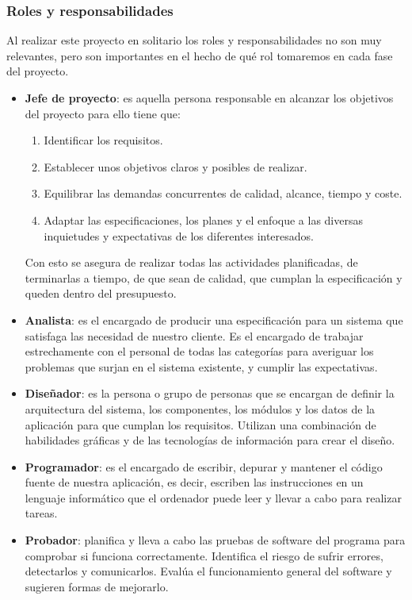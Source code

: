 \documentclass[a4paper,11pt, twoside]{article}
\begin{document}
\subsubsection{Roles y responsabilidades}
Al realizar este proyecto en solitario los roles y responsabilidades no son muy relevantes, pero son importantes en el hecho de qué rol tomaremos en cada fase del proyecto.
\begin{itemize}[noitemsep,topsep=0pt]
\item \textbf{Jefe de proyecto}: es aquella persona responsable en alcanzar los objetivos del proyecto para ello tiene que: 
\begin{enumerate}
\item Identificar los requisitos.
\item Establecer unos objetivos claros y posibles de realizar.
\item Equilibrar las demandas concurrentes de calidad, alcance, tiempo y coste.
\item Adaptar las especificaciones, los planes y el enfoque a las diversas inquietudes y expectativas de los diferentes interesados.
\end{enumerate}
Con esto se asegura de realizar todas las actividades planificadas, de terminarlas a tiempo, de que sean de calidad, que cumplan la especificación y queden dentro del presupuesto.
\bigskip
\item \textbf{Analista}: es el encargado de producir una especificación para un sistema que satisfaga las necesidad de nuestro cliente. Es el encargado de trabajar estrechamente con el personal de todas las categorías para averiguar los problemas que surjan en el sistema existente, y cumplir las expectativas.
\bigskip
\item \textbf{Diseñador}: es la persona o grupo de personas que se encargan de definir la arquitectura del sistema, los componentes, los módulos y los datos de la aplicación para que cumplan los requisitos. Utilizan una combinación de habilidades gráficas y de las tecnologías de información para crear el diseño.
\bigskip
\item \textbf{Programador}: es el encargado de escribir, depurar y mantener el código fuente de nuestra aplicación, es decir, escriben las instrucciones en un lenguaje informático que el ordenador puede leer y llevar a cabo para realizar tareas.
\bigskip
\item \textbf{Probador}: planifica y lleva a cabo las pruebas de software del programa para comprobar si funciona correctamente. Identifica el riesgo de sufrir errores, detectarlos y comunicarlos. Evalúa el funcionamiento general del software y sugieren formas de mejorarlo.
\end{itemize}
\end{document}
